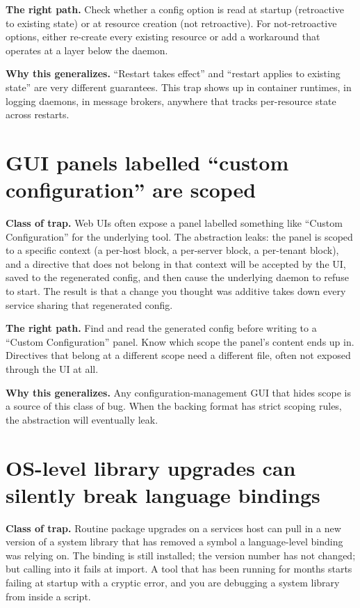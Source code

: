 \documentclass[12pt]{article}
\begin{document}
\textbf{The right path.} Check whether a config option is read at startup (retroactive to existing state) or at resource creation (not retroactive). For not-retroactive options, either re-create every existing resource or add a workaround that operates at a layer below the daemon.

\textbf{Why this generalizes.} ``Restart takes effect'' and ``restart applies to existing state'' are very different guarantees. This trap shows up in container runtimes, in logging daemons, in message brokers, anywhere that tracks per-resource state across restarts.

\section{GUI panels labelled ``custom configuration'' are scoped}

\textbf{Class of trap.} Web UIs often expose a panel labelled something like ``Custom Configuration'' for the underlying tool. The abstraction leaks: the panel is scoped to a specific context (a per-host block, a per-server block, a per-tenant block), and a directive that does not belong in that context will be accepted by the UI, saved to the regenerated config, and then cause the underlying daemon to refuse to start. The result is that a change you thought was additive takes down every service sharing that regenerated config.

\textbf{The right path.} Find and read the generated config before writing to a ``Custom Configuration'' panel. Know which scope the panel's content ends up in. Directives that belong at a different scope need a different file, often not exposed through the UI at all.

\textbf{Why this generalizes.} Any configuration-management GUI that hides scope is a source of this class of bug. When the backing format has strict scoping rules, the abstraction will eventually leak.

\section{OS-level library upgrades can silently break language bindings}

\textbf{Class of trap.} Routine package upgrades on a services host can pull in a new version of a system library that has removed a symbol a language-level binding was relying on. The binding is still installed; the version number has not changed; but calling into it fails at import. A tool that has been running for months starts failing at startup with a cryptic error, and you are debugging a system library from inside a script.
\end{document}
